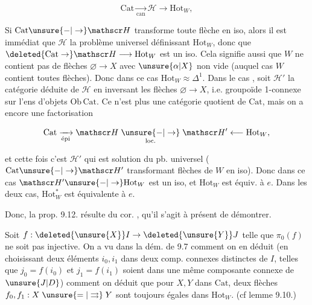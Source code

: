 \[
 \mathrm{Cat}\xrightarrow[\mathrm{can}]{}\mathscr H\longrightarrow\mathrm{Hot}_{W},
\]

 Si  $\mathrm{Cat}\unsure{-|\to}\mathscr H$ transforme toute flèche 
en iso, alors il est immédiat que $\mathscr H$  
la   problème universel définissant
$\mathrm{Hot}_{W}$, donc que $\deleted{\mathrm{Cat}\to}\mathscr H\longrightarrow\mathrm{Hot}_{W}$ est un iso.
Cela signifie aussi que  $W$ ne contient pas
de flèches $\varnothing\to X$ avec $\unsure{\alpha|X}$ non vide (auquel
cas $W$ contient toutes  flèches). Donc
dans ce cas $\mathrm{Hot}_{W}\approx\Delta^1$. Dans le cas ,
 soit $\mathscr H'$ la catégorie déduite de $\mathscr H$ en inversant
les flèches $\varnothing\longrightarrow X$, i.e.  groupoïde
1-connexe sur l'ens d'objets $\mathrm{Ob}\,\mathrm{Cat}$. Ce n'est
plus une catégorie quotient de $\mathrm{Cat}$, mais
on a encore une factorisation

\[
 \mathrm{Cat}\xrightarrow[\text{épi}]{}\mathscr H
 \mathrel{\mathop{\unsure{-|\to}}\limits_{\mathrm{loc.}}}\mathscr H'
 \longleftarrow\mathrm{Hot}_{W},
\]

et cette fois c'est $\mathscr H'$ qui est solution du pb.
universel ($\mathrm{Cat}\unsure{-|\to}\mathscr H'$ transformant flèches de
$W$ en iso). Donc dans ce cas $\mathscr H'\unsure{-|\to}\mathrm{Hot}_{W}$ est
un iso, et $\mathrm{Hot}_{W}$ est équiv. à $e$. Dans les
deux cas, $\mathrm{Hot}_{W}^{*}$ est équivalente à $e$.

Donc, la prop. 9.12. résulte du cor. , qu'il
s'agit à présent de démontrer.

Soit $f:\deleted{\unsure{X}}I\to\deleted{\unsure{Y}}J$  telle que $\pi_0(f)$ ne soit pas injective.
On a vu dans la dém. de 9.7 comment on en
déduit (en choisissant deux éléments $i_0,i_1$ dans deux
comp. connexes distinctes de $I$, telles que
 $j_0=f(i_0)$ et $j_1=f(i_1)$  soient dans une même
composante connexe de $\unsure{J|D}$) comment on déduit
que pour $X,Y$ dans $\mathrm{Cat}$, deux flèches $f_0,f_1:X\mathrel{\unsure{=|\rightrightarrows}}Y$
sont toujours égales dans  $\mathrm{Hot}_{W}$. (cf lemme 9.10.)

